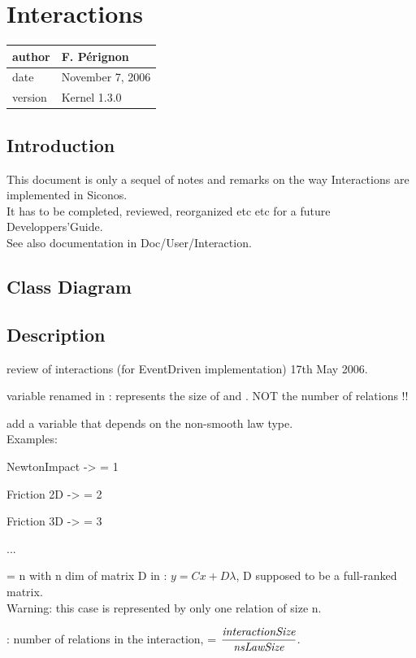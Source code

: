 \documentclass[10pt]{report}
\begin{document}
\chapter{Interactions}
\begin{table}[!ht]
  \begin{tabular}{|l|l|}
    \hline
    author  & F.  P\'erignon \\
    \hline
    date    & November 7, 2006 \\ 
    \hline
    version & Kernel 1.3.0 \\
    \hline
  \end{tabular}
\end{table}

\section{Introduction}
This document is only a sequel of notes and remarks on the way Interactions are implemented in Siconos.\\
It has to be completed, reviewed, reorganized etc etc for a future Developpers'Guide. \\
See also documentation in Doc/User/Interaction.

\section{Class Diagram}

\section{Description}

\begin{ndrfp} 
review of interactions (for EventDriven implementation) 17th May 2006.
\end{ndrfp}

\bei
\item variable  renamed in : represents the size of  and \varcpp{$\lambda$}. NOT the number of relations !! \\
\item add a variable  that depends on the non-smooth law type.\\
Examples:
\bei
\item NewtonImpact ->  = 1
\item Friction 2D  ->  = 2
\item Friction 3D  ->  = 3
\item ... 
\item {} = n with n dim of matrix D in :
$y=Cx+D\lambda$, D supposed to be a full-ranked matrix. \\
Warning: this case is represented by only one relation of size n. 
\ei
\item {}: number of relations in the interaction,  = $\displaystyle \frac{\textit{interactionSize}}{\textit{nsLawSize}}$.
\ei
\end{document}
